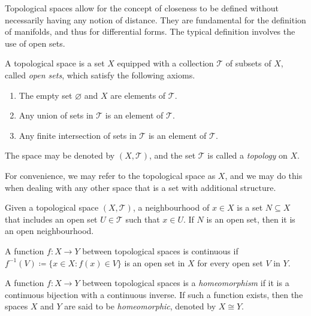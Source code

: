 \documentclass[a4paper,12pt]{article}
\begin{document}
\begin{appendices}
Topological spaces allow for the concept of closeness to be defined without necessarily having any notion of distance.
They are fundamental for the definition of manifolds, and thus for differential forms.
The typical definition involves the use of open sets.
\begin{definition}\label{def:topological_space}
    A topological space is a set $X$ equipped with a collection $\mathcal{T}$ of subsets of $X$, called \emph{open sets}, which satisfy the following axioms.
    \begin{enumerate}
        \item The empty set $\varnothing$ and $X$ are elements of $\mathcal{T}$.
        \item Any union of sets in $\mathcal{T}$ is an element of $\mathcal{T}$.
        \item Any finite intersection of sets in $\mathcal{T}$ is an element of $\mathcal{T}$.
    \end{enumerate}
    The space may be denoted by $(X, \mathcal{T})$, and the set $\mathcal{T}$ is called a \emph{topology} on $X$.
\end{definition}
\begin{remark}
    For convenience, we may refer to the topological space as $X$, and we may do this when dealing with any other space that is a set with additional structure.
\end{remark}
\begin{definition}[Neighbourhood]\label{def:neighbourhoods_via_open_sets}
    Given a topological space $(X, \mathcal{T})$, a neighbourhood of $x \in X$ is a set $N \subseteq X$ that includes an open set $U \in \mathcal{T}$ such that $x \in U$.
    If $N$ is an open set, then it is an open neighbourhood.
\end{definition}
\begin{definition}[Continuity]\label{def:continuity}
    A function $f \colon X \to Y$ between topological spaces is continuous if $f^{-1}(V) \coloneq \{x \in X : f(x) \in V\}$ is an open set in $X$ for every open set $V$ in $Y$.
\end{definition}
\begin{definition}[Homeomorphism]\label{def:homeomorphism}
    A function $f \colon X \to Y$ between topological spaces is a \emph{homeomorphism} if it is a continuous bijection with a continuous inverse.
    If such a function exists, then the spaces $X$ and $Y$ are said to be \emph{homeomorphic}, denoted by $X \cong Y$.
\end{definition}

\end{appendices}
\end{document}
